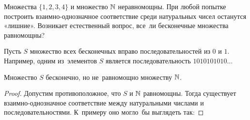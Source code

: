 \documentclass[12pt, a4paper]{article}
\begin{document}
Множества $\{1,2,3,4\}$ и множество $\mathbb N$ неравномощны. При любой попытке построить взаимно-однозначное соответствие среди натуральных чисел останутся «лишние». Возникает естественный вопрос, все~ли бесконечные множества равномощны?

Пусть $S$ множество всех бесконечных вправо последовательностей из $0$ и $1.$ Например, одним из~элементов $S$ является последовательность $1010101010\ldots$

\newpage

\begin{myth} 
Множество $S$ бесконечно, но не~равномощно множеству $\mathbb N$.
\end{myth}

\begin{proof} Допустим противоположное, что $S$ и $\mathbb N$ равномощны. Тогда существует взаимно-однозначное соответствие между натуральными числами и последовательностями. К~примеру оно могло~бы выглядеть так:


\end{proof}
\end{document}
